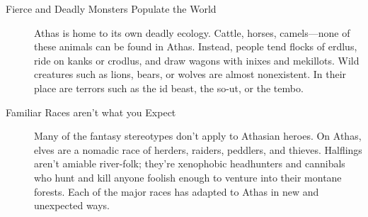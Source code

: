 \begin{description}
    \item [Fierce and Deadly Monsters Populate the World] Athas is home to its own deadly ecology. Cattle,
        horses, camels—none of these animals can be found in Athas. Instead, people tend flocks of erdlus,
        ride on kanks or crodlus, and draw wagons with inixes and mekillots. Wild creatures such as lions,
        bears, or wolves are almost nonexistent. In their place are terrors such as the id beast, the
        so-ut, or the tembo.

    \item [Familiar Races aren't what you Expect] Many of the fantasy stereotypes don’t apply to Athasian
        heroes. On Athas, elves are a nomadic race of herders, raiders, peddlers, and thieves. Halflings
        aren't amiable river-folk; they're xenophobic headhunters and cannibals who hunt and kill anyone
        foolish enough to venture into their montane forests. Each of the major races has adapted to Athas
        in new and unexpected ways.
\end{description}
